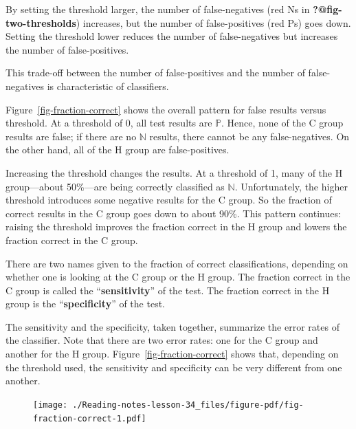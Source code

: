 \documentclass[
  letterpaper,
  DIV=11,
  numbers=noendperiod,
  oneside]{scrreprt}
\begin{document}
By setting the threshold larger, the number of false-negatives (red Ns
in \textbf{?@fig-two-thresholds}) increases, but the number of
false-positives (red Ps) goes down. Setting the threshold lower reduces
the number of false-negatives but increases the number of
false-positives.

This trade-off between the number of false-positives and the number of
false-negatives is characteristic of classifiers.

Figure~\ref{fig-fraction-correct} shows the overall pattern for false
results versus threshold. At a threshold of 0, all test results are
\({\mathbb{P}}\). Hence, none of the C group results are false; if there
are no \({\mathbb{N}}\) results, there cannot be any false-negatives. On
the other hand, all of the H group are false-positives.

Increasing the threshold changes the results. At a threshold of 1, many
of the H group---about 50\%---are being correctly classified as
\({\mathbb{N}}\). Unfortunately, the higher threshold introduces some
negative results for the C group. So the fraction of correct results in
the C group goes down to about 90\%. This pattern continues: raising the
threshold improves the fraction correct in the H group and lowers the
fraction correct in the C group.

There are two names given to the fraction of correct classifications,
depending on whether one is looking at the C group or the H group. The
fraction correct in the C group is called the ``\textbf{sensitivity}''
of the test. The fraction correct in the H group is the
``\textbf{specificity}'' of the test.

The sensitivity and the specificity, taken together, summarize the error
rates of the classifier. Note that there are two error rates: one for
the C group and another for the H group.
Figure~\ref{fig-fraction-correct} shows that, depending on the threshold
used, the sensitivity and specificity can be very different from one
another.

\begin{figure}


{\centering \texttt{[image: ./Reading-notes-lesson-34\_files/figure-pdf/fig-fraction-correct-1.pdf]}

}

\end{figure}
\end{document}
